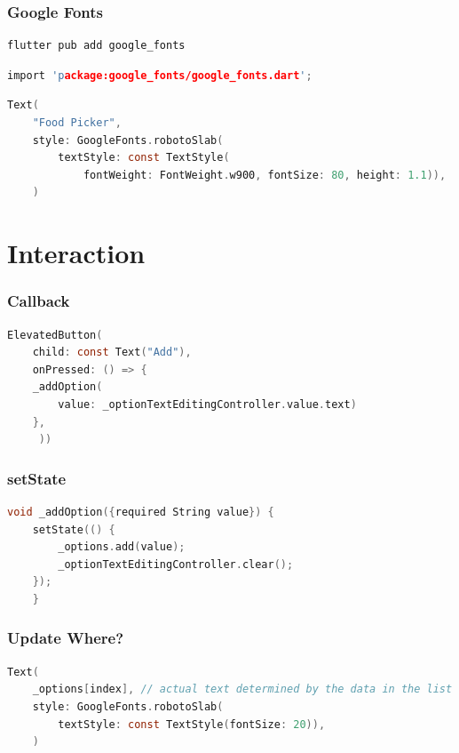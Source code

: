 \documentclass[compress, aspectratio=32]{beamer}
\begin{document}
\begin{frame}[fragile]
    \frametitle{Google Fonts}
    \begin{lstlisting}[numbers=none]
flutter pub add google_fonts
    \end{lstlisting}
    \begin{lstlisting}[language=c, firstnumber=3]
import 'package:google_fonts/google_fonts.dart';
    \end{lstlisting}
    \begin{lstlisting}[language=c, firstnumber=100]
Text(
    "Food Picker",
    style: GoogleFonts.robotoSlab(
        textStyle: const TextStyle(
            fontWeight: FontWeight.w900, fontSize: 80, height: 1.1)),
    )
    \end{lstlisting}
\end{frame}

\section{Interaction}
\begin{frame}[fragile]
    \frametitle{Callback}
    \begin{lstlisting}[language=c, firstnumber=114]
ElevatedButton(
    child: const Text("Add"),
    onPressed: () => {
    _addOption(
        value: _optionTextEditingController.value.text)
    },
     ))
    \end{lstlisting}
\end{frame}
\begin{frame}[fragile]
    \frametitle{setState}
    \begin{lstlisting}[language=c, firstnumber=114]
void _addOption({required String value}) {
    setState(() {
        _options.add(value);
        _optionTextEditingController.clear();
    });
    }
    \end{lstlisting}        
\end{frame}

\begin{frame}[fragile]
    \frametitle{Update Where?}
    \begin{lstlisting}[language=c, firstnumber=151]
Text(
    _options[index], // actual text determined by the data in the list _options
    style: GoogleFonts.robotoSlab(
        textStyle: const TextStyle(fontSize: 20)),
    )
    \end{lstlisting}
\end{frame}
\end{document}

